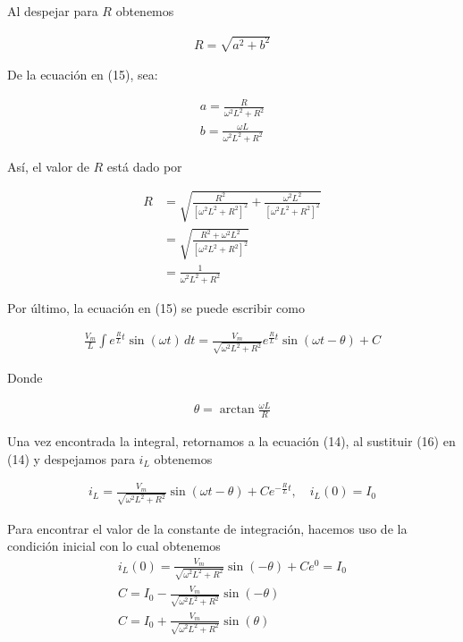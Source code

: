 \documentclass{article}
\begin{document}
\noindent Al despejar para $R$ obtenemos

\begin{align}
	R = \sqrt{a^2 + b^2} \nonumber
\end{align}

\noindent De la ecuación en (15), sea:

\begin{align}
	a = \frac{R}{\omega^2 L^2 + R^2} \nonumber \\
	b = \frac{\omega L}{\omega^2 L^2 + R^2} \nonumber
\end{align}

\noindent Así, el valor de $R$ está dado por

\begin{align}
	R &= \sqrt{\frac{R^2}{ \left[ \omega^2 L^2 + R^2 \right]^2} +  \frac{\omega^2 L^2}{ \left[ \omega^2 L^2 + R^2 \right]^2} } \nonumber \\
	&= \sqrt{ \frac{R^2 + \omega^2 L^2}{ \left[ \omega^2 L^2 + R^2 \right]^2} } \nonumber \\
	&= \frac{1}{\omega^2 L^2 + R^2} \nonumber
\end{align}

\noindent Por último, la ecuación en (15) se puede escribir como

\begin{align}
		\frac{V_m}{L} \int e^{\frac{R}{L}t}\sin(\omega t) \, dt = \frac{V_m}{\sqrt{  \omega^2 L^2 + R^2 }} e^{\frac{R}{L}t} \sin (\omega t - \theta) + C
\end{align}

\noindent Donde

\begin{align}
	\theta = \arctan{\frac{\omega L}{R}}
\end{align}

\noindent Una vez encontrada la integral, retornamos a la ecuación (14), al sustituir (16) en (14) y despejamos para $i_L$ obtenemos

\begin{align}
	i_L  = \frac{V_m}{\sqrt{  \omega^2 L^2 + R^2 }} \sin (\omega t - \theta) + Ce^{-\frac{R}{L}t}, \quad i_L(0) = I_0
\end{align}

\noindent Para encontrar el valor de la constante de integración, hacemos uso de la condición inicial con lo cual obtenemos
\begin{align}
	i_L(0) = \frac{V_m}{\sqrt{  \omega^2 L^2 + R^2 }} \sin ( - \theta) + Ce^{0} = I_0 \nonumber \\
	C = I_0 -  \frac{V_m}{\sqrt{  \omega^2 L^2 + R^2 }} \sin ( - \theta) \nonumber \\
	C = I_0 +  \frac{V_m}{\sqrt{  \omega^2 L^2 + R^2 }} \sin (\theta)
\end{align}
\end{document}
